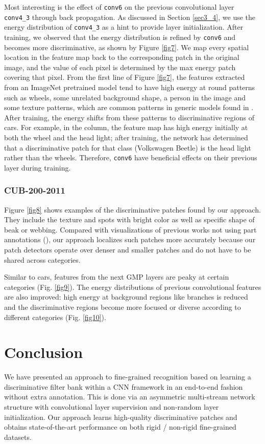\documentclass[10pt,twocolumn,letterpaper]{article}
\begin{document}
Most interesting is the effect of \texttt{conv6} on the previous convolutional layer \texttt{conv4\_3} through back
propagation. As discussed in Section \ref{sec3_4},
we use the energy distribution of \texttt{conv4\_3} as a hint to provide layer initialization. After training, we
observed that the energy distribution is refined by \texttt{conv6} and becomes more discriminative, as shown by Figure
\ref{fig7}.
We map every spatial location in the
feature map back to the corresponding patch in the original image, and the value of each pixel is determined by the max
energy patch covering that pixel. From the first line of Figure \ref{fig7}, the features extracted from an ImageNet
pretrained model tend to have high energy at round patterns such as wheels, some unrelated background shape, a person in
the image and some texture patterns, which are common patterns in generic models found in \cite{fergus14}. After
training, the energy shifts from these patterns to discriminative regions of cars. For example, in the 
column, the feature map has high energy initially at both the wheel and the head light; after training, the network
has determined that a discriminative patch for that class (Volkswagen Beetle) is the head light rather than the wheels.
Therefore, \texttt{conv6} have beneficial effects on their previous layer during training.

\subsubsection{CUB-200-2011} \label{sec4_4_3}
Figure \ref{fig8} shows examples of the discriminative patches found by our approach. They include the
texture and spots with bright color as well as specific shape of beak or webbing. Compared with
visualizations of previous works not using part annotations (\eg \cite{krause15, b_cnn}), our approach 
localizes such patches more accurately because our patch detectors operate over denser and smaller
patches and do not have to be shared across categories. 

Similar to cars, features from the next GMP layers are peaky at certain categories (Fig. \ref{fig9}). The energy
distributions of previous convolutional features are also improved: high energy at background regions like 
branches is reduced and the discriminative regions become more focused or diverse according to different categories
(Fig. \ref{fig10}).

\section{Conclusion} \label{sec5}
We have presented an approach to fine-grained recognition based on learning a discriminative filter bank within a CNN
framework in an end-to-end fashion without extra annotation. This is done via an asymmetric multi-stream network
structure with convolutional layer supervision and non-random layer initialization.
Our approach learns high-quality discriminative patches and obtains state-of-the-art performance
on both rigid / non-rigid fine-grained datasets. 

{\small


}
\end{document}
